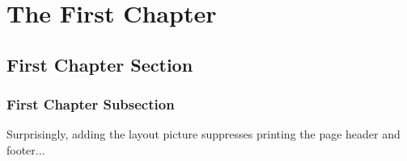 \chapter{The First Chapter}
\section{First Chapter Section}

\subsection{First Chapter Subsection}

\blindtext
\newpage
\blindtext
\newpage
Surprisingly, adding the layout picture suppresses printing the page header and footer...
\layout